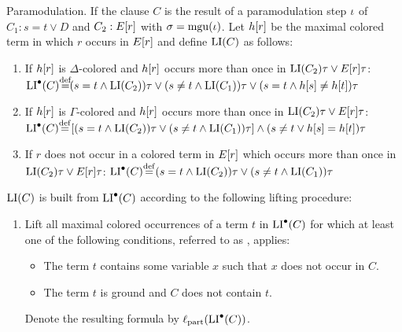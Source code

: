 \begin{defi}
\begin{description}
		\item{} Paramodulation.
			If the clause $C$ is the result of a paramodulation step $\iota$ of $C_1 : s = t \lor D$ and $C_2: E[r]$ with $\sigma = \operatorname{mgu}(\iota)$.
			Let $h[r]$ be the maximal colored term in which $r$ occurs in $E[r]$
			and define $\operatorname{LI}(C)$ as follows:

			\begin{enumerate}

				\item If $h[r]$ is $\Delta$-colored and $h[r]$ occurs more than once in $\operatorname{LI}(C_2)\tau \lor E[r]\tau$:
					\newline
					$\LIpre(C) \defeq  ( s=t \land \LI(C_2) )\tau \lor (s\neq t \land \LI(C_1))\tau \lor (s=t \land h\occur{s} \neq      h\occur{t})\tau$

				\item If $h[r]$ is $\Gamma$-colored and $h[r]$ occurs more than once in $\operatorname{LI}(C_2)\tau \lor E[r]\tau$:
					\newline
					$\LIpre(C)\defeq{} [ ( s=t \land \LI(C_2) )\tau \lor (s\neq t \land \LI(C_1))\tau ] \land\allowbreak (s\neq t \lor h\occur{s} = h\occur{t})\tau$

				\item If $r$ does not occur in a colored term in $E[r]$ which occurs more than once in $\operatorname{LI}(C_2)\tau \lor E[r]\tau$:
					\newline
					$\LIpre(C) \defeq{} ( s=t \land \LI(C_2) )\tau \lor (s\neq t \land \LI(C_1))\tau $ 

			\end{enumerate}
	\end{description}

	\noindent
	$\operatorname{LI}(C)$ is built from $\operatorname{LI}^\bullet(C)$ according to the following lifting procedure:

	\begin{enumerate}
		\item Lift all maximal colored occurrences of a term $t$ in $\operatorname{LI}^\bullet(C)$ for which at least one of the following conditions, referred to as , applies:
			\begin{itemize} 
				\item The term $t$ contains some variable $x$ such that $x$ does not occur in $C$.
				\item The term $t$ is ground and $C$ does not contain $t$.
			\end{itemize} 
			Denote the resulting formula by $\ell_\mathrm{part}(\operatorname{LI}^\bullet(C))$.


\end{enumerate}
\end{defi}
